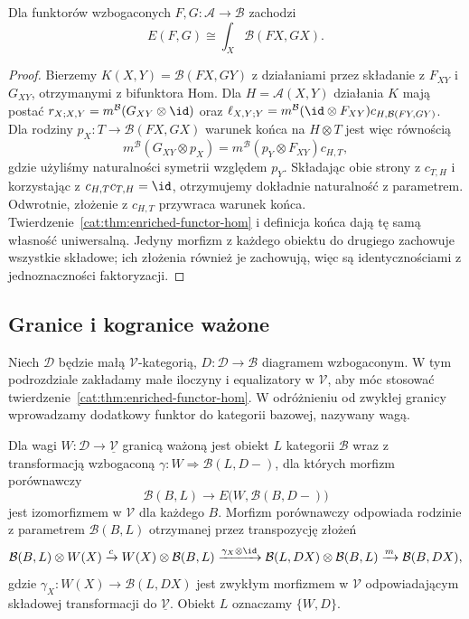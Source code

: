 \begin{wniosek}\label{cat:cor:enriched-nat-end}
Dla funktorów wzbogaconych $F,G:\mathcal A\to\mathcal B$ zachodzi
\[
 E(F,G)\cong\int_X\mathcal B(FX,GX).
\]
\end{wniosek}
\begin{proof}
Bierzemy $K(X,Y)=\mathcal B(FX,GY)$ z działaniami przez składanie z $F_{XY}$ i $G_{XY}$, otrzymanymi z bifunktora Hom. Dla $H=\mathcal A(X,Y)$ działania $K$ mają postać $r_{X;X,Y}=m^{\mathcal B}(G_{XY}\otimes\id)$ oraz $\ell_{X,Y;Y}=m^{\mathcal B}(\id\otimes F_{XY})c_{H,\mathcal B(FY,GY)}$. Dla rodziny $p_X:T\to\mathcal B(FX,GX)$ warunek końca na $H\otimes T$ jest więc równością
\[
 m^{\mathcal B}(G_{XY}\otimes p_X)
 =m^{\mathcal B}(p_Y\otimes F_{XY})c_{H,T},
\]
gdzie użyliśmy naturalności symetrii względem $p_Y$. Składając obie strony z $c_{T,H}$ i korzystając z $c_{H,T}c_{T,H}=\id$, otrzymujemy dokładnie naturalność z parametrem. Odwrotnie, złożenie z $c_{H,T}$ przywraca warunek końca. Twierdzenie~\ref{cat:thm:enriched-functor-hom} i definicja końca dają tę samą własność uniwersalną. Jedyny morfizm z każdego obiektu do drugiego zachowuje wszystkie składowe; ich złożenia również je zachowują, więc są identycznościami z jednoznaczności faktoryzacji.
\end{proof}

\subsection{Granice i kogranice ważone}

Niech $\mathcal D$ będzie małą $\mathcal V$-kategorią, $D:\mathcal D\to\mathcal B$ diagramem wzbogaconym. W tym podrozdziale zakładamy małe iloczyny i equalizatory w $\mathcal V$, aby móc stosować twierdzenie~\ref{cat:thm:enriched-functor-hom}. W odróżnieniu od zwykłej granicy wprowadzamy dodatkowy funktor do kategorii bazowej, nazywany wagą.

\begin{definicja}\label{cat:def:enriched-weighted-limit}
Dla wagi $W:\mathcal D\to\underline{\mathcal V}$ granicą ważoną jest obiekt $L$ kategorii $\mathcal B$ wraz z transformacją wzbogaconą $\gamma:W\Rightarrow\mathcal B(L,D-)$, dla których morfizm porównawczy
\[
 \mathcal B(B,L)\longrightarrow
 E\bigl(W,\mathcal B(B,D-)\bigr)
\]
jest izomorfizmem w $\mathcal V$ dla każdego $B$. Morfizm porównawczy odpowiada rodzinie z parametrem $\mathcal B(B,L)$ otrzymanej przez transpozycję złożeń
\[
 \mathcal B(B,L)\otimes W(X)
 \xrightarrow{c}W(X)\otimes\mathcal B(B,L)
 \xrightarrow{\gamma_X\otimes\id}
 \mathcal B(L,DX)\otimes\mathcal B(B,L)
 \xrightarrow{m}\mathcal B(B,DX),
\]
gdzie $\gamma_X:W(X)\to\mathcal B(L,DX)$ jest zwykłym morfizmem w $\mathcal V$ odpowiadającym składowej transformacji do $\underline{\mathcal V}$. Obiekt $L$ oznaczamy $\{W,D\}$.
\end{definicja}

